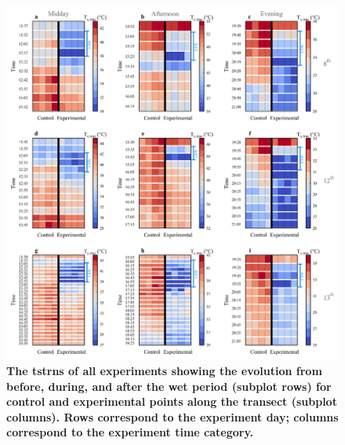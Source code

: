\documentclass[final,3p,times,authoryear]{elsarticle}
\begin{document}

\begin{figure}
\centering
\includegraphics[trim={0 0 0 0},clip,scale=1.0]{pict044.png}
\caption{\bf The \gls{tstrns} of all experiments showing the evolution from before, during, and after the wet period (subplot rows) for control and experimental points along the transect (subplot columns). Rows correspond to the experiment day; columns correspond to the experiment time category.}
 \label{fig:7.15}
\end{figure}


\end{document}

